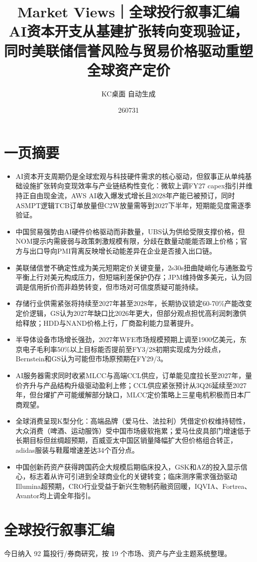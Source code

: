 \documentclass[11pt]{ctexart}
\title{\textbf{Market Views｜全球投行叙事汇编}\\[0.4em]{\large AI资本开支从基建扩张转向变现验证，同时美联储信誉风险与贸易价格驱动重塑全球资产定价}}
\author{KC桌面 自动生成}
\date{260731}
\begin{document}
\maketitle
\tableofcontents
\newpage
\section{一页摘要}
\begin{itemize}
  \item AI资本开支周期仍是全球宏观与科技硬件需求的核心驱动，但叙事正从单纯基础设施扩张转向变现效率与产业链结构性变化：微软上调FY27 capex指引并维持正自由现金流，AWS AI收入爆发式增长且2028年产能已被预订，同时ASMPT逻辑TCB订单放量但C2W放量需等到2027下半年，短期能见度需逐季验证。
  \item 中国贸易强势由AI硬件价格驱动而非数量，UBS认为供给受限支撑价格，但NOM提示内需疲弱与政策刺激规模有限，分歧在数量动能能否跟上价格；官方与出口导向PMI背离反映增长动能差异在企业是否接入出口链。
  \item 美联储信誉不确定性成为美元短期定价关键变量，2s30s扭曲陡峭化与通胀盈亏平衡上行对美元构成压力，但短端利差保护仍存；JPM维持做多美元，认为回调是信用折价而非趋势转变，但市场对可信度质疑可能持续。
  \item 存储行业供需紧张将持续至2027年甚至2028年，长期协议锁定60-70\%产能改变定价逻辑，GS认为2027年缺口比2026年更大，但部分观点担忧高利润刺激供给释放；HDD与NAND价格上行，厂商盈利能力显著提升。
  \item 半导体设备市场增长强劲，2027年WFE市场规模预期上调至1900亿美元，东京电子毛利率50\%以上目标能否提前至FY3/28初期实现成为分歧点，Bernstein和GS认为可能但市场原预期在FY29/3。
  \item AI服务器需求同时收紧MLCC与高端CCL供应，订单能见度拉长至2027年，量价齐升与产品结构升级驱动盈利上修；CCL供应紧张预计从3Q26延续至2027年，但台燿扩产可能缓解部分缺口，MLCC定价策略上三星电机积极而日本厂商观望。
  \item 全球消费呈现K型分化：高端品牌（爱马仕、法拉利）凭借定价权维持韧性，大众消费（啤酒、运动服饰）受中国市场疲软拖累；爱马仕皮具部门增速低于长期目标但丝绸超预期，百威亚太中国区销量降幅扩大但价格组合转正，adidas服装与鞋履增速差达34个百分点。
  \item 中国创新药资产获得跨国药企大规模后期临床投入，GSK和AZ的投入显示信心，标志着从许可引进到全球商业化的关键转变；临床测序需求强劲驱动Illumina超预期，CRO行业受益于新兴生物制药融资回暖，IQVIA、Fortrea、Avantor均上调全年指引。
\end{itemize}
\section{全球投行叙事汇编}
今日纳入 92 篇投行/券商研究，按 19 个市场、资产与产业主题系统整理。
\newpage
\end{document}
